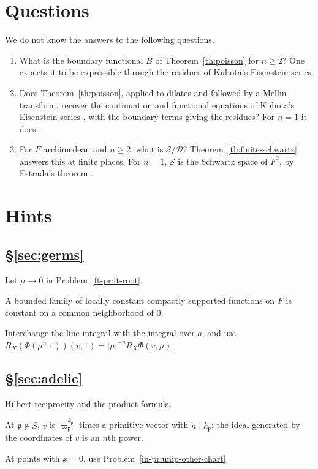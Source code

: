 \documentclass[reqno]{amsart}
\newcommand{\Dc}{\mathcal{D}}
\newcommand{\Sc}{\mathcal{S}}
\newcommand{\pp}{\mathfrak{p}}
\numberwithin{equation}{section}
\theoremstyle{definition}
\theoremstyle{plain}
\newenvironment{hints}{\begin{description}[font=\normalfont\bfseries]}{\end{description}}
\begin{document}
\section*{Questions}

We do not know the answers to the following questions.
\begin{enumerate}
\item What is the boundary functional $B$ of Theorem~\ref{th:poisson} for $n \geq 2$?  One expects it to be expressible through the residues of Kubota's Eisenstein series.
\item Does Theorem~\ref{th:poisson}, applied to dilates and followed by a Mellin transform, recover the continuation and functional equations of Kubota's Eisenstein series \cite{Kub69}, with the boundary terms giving the residues?  For $n = 1$ it does \cite[\S\S3--5]{God}.
\item For $F$ archimedean and $n \geq 2$, what is $\Sc / \Dc$?  Theorem~\ref{th:finite-schwartz} answers this at finite places.  For $n = 1$, $\Sc$ is the Schwartz space of $F^2$, by Estrada's theorem \cite[Theorem~4.1]{Est}.
\end{enumerate}

\section*{Hints}

\subsection*{\S\ref{sec:germs}}
\begin{hints}
\item[\ref{pr:leading-transform}] Let $\mu \to 0$ in Problem~\ref{ft-pr:ft-root}.
\item[\ref{pr:finite-germs}] A bounded family of locally constant compactly supported functions on $F$ is constant on a common neighborhood of $0$.
\item[\ref{pr:germ-average}] Interchange the line integral with the integral over $a$, and use $R_X(\Phi(\mu^n \, \cdot))(v, 1) = \lvert \mu \rvert^{-n} R_X \Phi(v, \mu)$.
\end{hints}

\subsection*{\S\ref{sec:adelic}}
\begin{hints}
\item[\ref{pr:global-values}] Hilbert reciprocity and the product formula.
\item[\ref{pr:theta-S}] At $\pp \notin S$, $v$ is $\varpi_\pp^{k_\pp}$ times a primitive vector with $n \mid k_\pp$; the ideal generated by the coordinates of $v$ is an $n$th power.
\item[\ref{pr:rational-invariance}] At points with $x = 0$, use Problem~\ref{in-pr:unip-other-chart}.
\end{hints}
\end{document}
